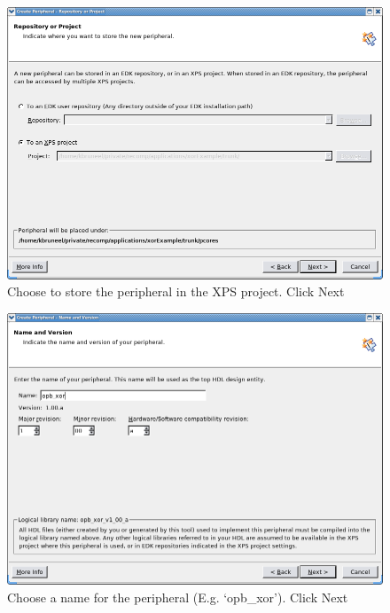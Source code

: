 \documentclass[a4paper,oneside]{memoir}
\begin{document}
\begin{figure}[H]
\centering
\includegraphics[scale=0.5]{COIP3}
\caption{Choose to store the peripheral in the XPS project. Click Next\label{fig:COIP3}}
\end{figure}
\begin{figure}[H]
\centering
\includegraphics[scale=0.5]{COIP4}
\caption{Choose a name for the peripheral (E.g. `opb\_xor'). Click Next\label{fig:COIP4}}
\end{figure}
\end{document}
